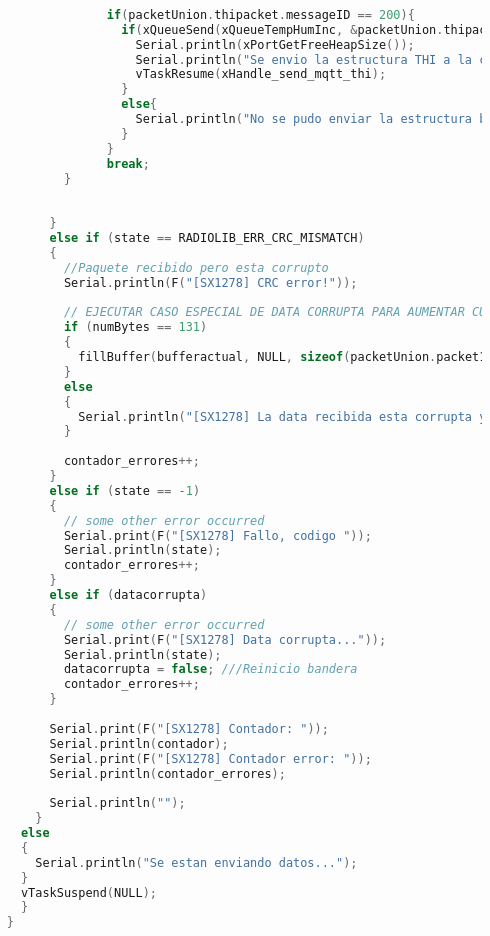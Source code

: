 \begin{lstlisting}[language=C++, caption=Tarea de recepción de datos de aceleración vía Lora en estación base]
    
                  if(packetUnion.thipacket.messageID == 200){
                    if(xQueueSend(xQueueTempHumInc, &packetUnion.thipacket, portMAX_DELAY)){
                      Serial.println(xPortGetFreeHeapSize());
                      Serial.println("Se envio la estructura THI a la cola");
                      vTaskResume(xHandle_send_mqtt_thi);
                    }
                    else{
                      Serial.println("No se pudo enviar la estructura bufferprueba a la cola xQueueBufferACL");
                    }
                  }
                  break;
            }
    
    
          }
          else if (state == RADIOLIB_ERR_CRC_MISMATCH)
          {
            //Paquete recibido pero esta corrupto
            Serial.println(F("[SX1278] CRC error!"));
    
            // EJECUTAR CASO ESPECIAL DE DATA CORRUPTA PARA AUMENTAR CURRENTPOS Y GUARDAR 0s EN BUFFER DE INTERES
            if (numBytes == 131)
            {
              fillBuffer(bufferactual, NULL, sizeof(packetUnion.packet1.payload), true);
            }
            else
            {
              Serial.println("[SX1278] La data recibida esta corrupta y no es para este receptor");
            }
    
            contador_errores++;
          }
          else if (state == -1)
          {
            // some other error occurred
            Serial.print(F("[SX1278] Fallo, codigo "));
            Serial.println(state);
            contador_errores++;
          }
          else if (datacorrupta)
          {
            // some other error occurred
            Serial.print(F("[SX1278] Data corrupta..."));
            Serial.println(state);
            datacorrupta = false; ///Reinicio bandera
            contador_errores++;
          }
    
          Serial.print(F("[SX1278] Contador: "));
          Serial.println(contador);
          Serial.print(F("[SX1278] Contador error: "));
          Serial.println(contador_errores);
    
          Serial.println("");
        }
      else
      {
        Serial.println("Se estan enviando datos...");
      }
      vTaskSuspend(NULL);
      }
    }
    
    \end{lstlisting}

